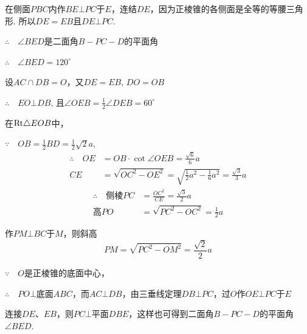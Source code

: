 \begin{solution}
在侧面$PBC$内作$BE\bot PC$于$E$，连结$DE$，因为正棱锥的各侧面是全等的等腰三角形. 所以$DE=EB$且$DE\bot PC$.

$\therefore\quad \angle BED$是二面角$B-PC-D$的平面角

$\therefore\quad \angle BED=120^{\circ}$

设$AC\cap DB=O$，又$DE=EB$, $DO=OB$

$\therefore\quad EO\bot DB$, 且$\angle OEB=\frac{1}{2}\angle DEB=60^{\circ}$

在${\rm Rt}\triangle EOB$中，

\noindent
\begin{minipage}{.55\textwidth}\CTEXindent
$\because\quad OB=\frac{1}{2}BD=\frac{1}{2}\sqrt{2}a$,
\[\begin{split}
    \therefore\quad OE&=OB\cdot \cot\angle OEB=\frac{\sqrt{6}}{6}a\\
     CE&=\sqrt{OC^2-OE^2}=\sqrt{\frac{1}{2}a^2-\frac{1}{6}a^2}=\frac{\sqrt{3}}{3}a
\end{split}\]
\[\begin{split}
    \therefore\quad \text{侧棱} PC&=\frac{OC^2}{CE}=\frac{\sqrt{3}}{2}a\\
    \text{高}PO&=\sqrt{PC^2-OC^2}=\frac{1}{2}a
\end{split}\]

作$PM\bot BC$于$M$，则斜高
\[PM=\sqrt{PC^2-OM^2}=\frac{\sqrt{2}}{2}a\]
\end{minipage}
\hfill
\begin{minipage}{.42\textwidth}
\centering
{}
\end{minipage}

\end{solution}

\begin{remark}
    $\because\quad O$是正棱锥的底面中心，
    
    $\therefore\quad PO\bot $底面$ABC$，而$AC\bot DB$，由三垂线定理$DB\bot PC$，过$O$作$OE\bot PC$于$E$

    连接$DE$、$EB$，则$PC\bot $平面$DBE$，这样也可得到二面角$B-PC-D$的平面角$\angle BED$.
\end{remark}


